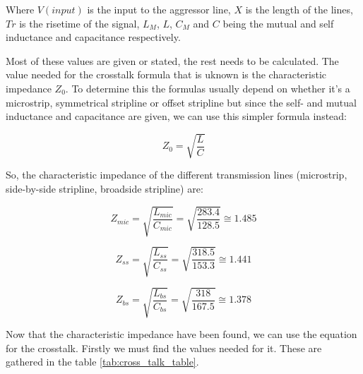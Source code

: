 \documentclass[../main.tex]{subfiles}
\begin{document}
Where $V(input)$ is the input to the aggressor line, $X$ is the length of the lines, $Tr$ is the risetime of the signal, $L_M$, $L$, $C_M$ and $C$ being the mutual and self inductance and capacitance respectively.

\vspace{10pt}
Most of these values are given or stated, the rest needs to be calculated. The value needed for the crosstalk formula that is uknown is the characteristic impedance $Z_0$. To determine this the formulas usually depend on whether it's a microstrip, symmetrical stripline or offset stripline but since the self- and mutual inductance and capacitance are given, we can use this simpler formula instead:

\begin{equation*}
    Z_0 = \sqrt{\frac{L}{C}}
\end{equation*}

\vspace{10pt}

So, the characteristic impedance of the different transmission lines (microstrip, side-by-side stripline, broadside stripline) are:

\begin{equation}
    Z_{mic} = \sqrt{\frac{L_{mic}}{C_{mic}}} = \sqrt{\frac{283.4}{128.5}} \cong 1.485
\label{eq:z_mic}
\end{equation}

\begin{equation}
    Z_{ss} = \sqrt{\frac{L_{ss}}{C_{ss}}} = \sqrt{\frac{318.5}{153.3}} \cong 1.441
\label{eq:z_ss}
\end{equation}

\begin{equation}
    Z_{bs} = \sqrt{\frac{L_{bs}}{C_{bs}}} = \sqrt{\frac{318}{167.5}} \cong 1.378
\label{eq:z_bs}
\end{equation}

Now that the characteristic impedance have been found, we can use the equation for the crosstalk. Firstly we must find the values needed for it. These are gathered in the table \ref{tab:cross_talk_table}.
\end{document}
